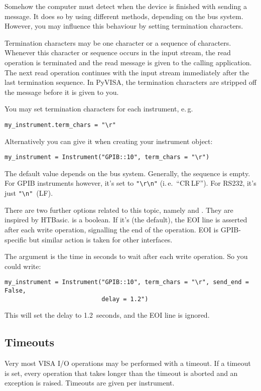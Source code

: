 \documentclass{howto}
\begin{document}
Somehow the computer must detect when the device is finished with sending a
message.  It does so by using different methods, depending on the bus system.
However, you may influence this behaviour by setting termination characters.

Termination characters may be one character or a sequence of characters.
Whenever this character or sequence occurs in the input stream, the read
operation is terminated and the read message is given to the calling
application.  The next read operation continues with the input stream
immediately after the last termination sequence.  In PyVISA, the termination
characters are stripped off the message before it is given to you.

You may set termination characters for each instrument, e.\,g.
\begin{verbatim}
my_instrument.term_chars = "\r"
\end{verbatim}
Alternatively you can give it when creating your instrument object:
\begin{verbatim}
my_instrument = Instrument("GPIB::10", term_chars = "\r")
\end{verbatim}
The default value depends on the bus system.  Generally, the sequence is empty.
For GPIB instruments however, it's set to \verb|"\r\n"| (i.\,e.~``CR\,LF'')\@.
For RS232, it's just \verb|"\n"|~(LF)\@.

There are two further options related to this topic, namely  and
.  They are inspired by HTBasic.   is a boolean.  If
it's  (the default), the EOI line is asserted after each write
operation, signalling the end of the operation.  EOI is GPIB-specific but
similar action is taken for other interfaces.

The argument  is the time in seconds to wait after each write
operation.  So you could write:
\begin{verbatim}
my_instrument = Instrument("GPIB::10", term_chars = "\r", send_end = False,
                           delay = 1.2")
\end{verbatim}
This will set the delay to 1.2~seconds, and the EOI line is ignored.


\subsection{Timeouts}
\label{sec:timeouts}

Very most VISA I/O operations may be performed with a timeout.  If a timeout is
set, every operation that takes longer than the timeout is aborted and an
exception is raised.  Timeouts are given per instrument.
\end{document}
